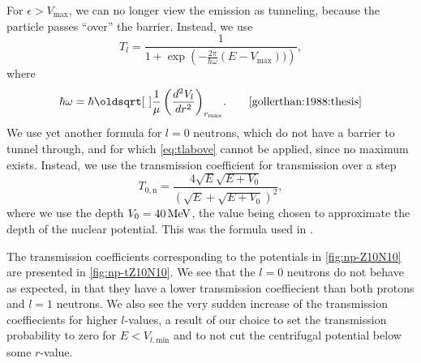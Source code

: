 For $\epsilon>V_\text{max}$, we can no longer view the emission as tunneling, because the particle passes ``over'' the barrier. Instead, we use
\begin{equation}
T_l = \frac{1}{1+\exp{\left(-\frac{2\pi}{\hbar \omega}(E-V_\text{max}))\right)}},\label{eq:tlabove}
\end{equation}
where
\begin{equation}
\hbar\omega = \hbar\sqrt{\frac{1}{\mu}\left(\frac{d^2V_l}{dr^2}\right)_{r_\text{max}}}.\qquad\cite{gollerthan:1988:thesis}
\end{equation}
We use yet another formula for $l=0$ neutrons, which do not have a barrier to tunnel through, and for which \autoref{eq:tlabove} cannot be applied, since no maximum exists. Instead, we use the transmission coefficient for transmission over a step 
\begin{equation}
T_{0,\text{n}} = \frac{4\sqrt{E}\sqrt{E+V_0}}{(\sqrt{E}+\sqrt{E+V_0})^2},\label{eq:t0n}
\end{equation}
where we use the depth $V_0=\unit[40]{MeV}$, the value being chosen to approximate the depth of the nuclear potential\cite{welldepth}. This was the formula used in .

The transmission coefficients corresponding to the potentials in \autoref{fig:np-Z10N10} are presented in \autoref{fig:np-tZ10N10}.  We see that the $l=0$ neutrons do not behave as expected, in that they have a lower transmission coeffiecient than both protons and $l=1$ neutrons. We also see the very sudden increase of the transmission coeffiecients for higher $l$-values, a result of our choice to set the transmission probability to zero for $E<V_{l,\text{min}}$ and to not cut the centrifugal potential below some $r$-value.

